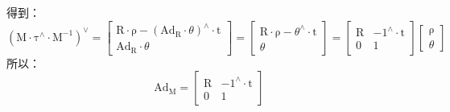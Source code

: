 \documentclass[12pt, onecolumn]{article}
\newcommand\liehat[1]{#1^{\land}}
\newcommand\lievee[1]{#1^\vee}
\newcommand\bsm[1]{\boldsymbol{\mathrm{#1}}}
\begin{document}
	得到：
	\begin{equation}
	\lievee{\left(\bsm{M}\cdot\liehat{\bsm{\tau}}\cdot\bsm{M}^{-1} \right) }=
	\begin{bmatrix}
	\bsm{R}\cdot\bsm{\rho}-\liehat{\left( \bsm{Ad}_{\bsm{R}}\cdot\theta\right) }\cdot\bsm{t}\\
	\bsm{Ad}_{\bsm{R}}\cdot\theta
	\end{bmatrix}=	\begin{bmatrix}
		\bsm{R}\cdot\bsm{\rho}-\liehat{\theta}\cdot\bsm{t}\\
		\theta
		\end{bmatrix}=\begin{bmatrix}
		\bsm{R}&-\liehat{1}\cdot\bsm{t}\\
		\bsm{0}&1
		\end{bmatrix}\begin{bmatrix}
			\bsm{\rho}\\\theta
			\end{bmatrix}
	\end{equation}
	所以：
	\begin{equation}
	\bsm{Ad}_{\bsm{M}}=\begin{bmatrix}
			\bsm{R}&-\liehat{1}\cdot\bsm{t}\\
			\bsm{0}&1
			\end{bmatrix}
	\end{equation}
\end{document}
